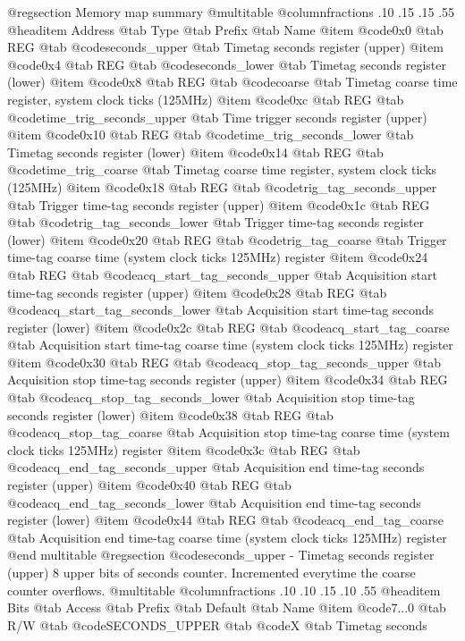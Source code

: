 @regsection Memory map summary
@multitable  @columnfractions .10 .15 .15 .55
@headitem Address @tab Type @tab Prefix @tab Name
@item @code{0x0} @tab
REG @tab
@code{seconds_upper} @tab
Timetag seconds register (upper)
@item @code{0x4} @tab
REG @tab
@code{seconds_lower} @tab
Timetag seconds register (lower)
@item @code{0x8} @tab
REG @tab
@code{coarse} @tab
Timetag coarse time register, system clock ticks (125MHz)
@item @code{0xc} @tab
REG @tab
@code{time_trig_seconds_upper} @tab
Time trigger seconds register (upper)
@item @code{0x10} @tab
REG @tab
@code{time_trig_seconds_lower} @tab
Timetag seconds register (lower)
@item @code{0x14} @tab
REG @tab
@code{time_trig_coarse} @tab
Timetag coarse time register, system clock ticks (125MHz)
@item @code{0x18} @tab
REG @tab
@code{trig_tag_seconds_upper} @tab
Trigger time-tag seconds register (upper)
@item @code{0x1c} @tab
REG @tab
@code{trig_tag_seconds_lower} @tab
Trigger time-tag seconds register (lower)
@item @code{0x20} @tab
REG @tab
@code{trig_tag_coarse} @tab
Trigger time-tag coarse time (system clock ticks 125MHz) register
@item @code{0x24} @tab
REG @tab
@code{acq_start_tag_seconds_upper} @tab
Acquisition start time-tag seconds register (upper)
@item @code{0x28} @tab
REG @tab
@code{acq_start_tag_seconds_lower} @tab
Acquisition start time-tag seconds register (lower)
@item @code{0x2c} @tab
REG @tab
@code{acq_start_tag_coarse} @tab
Acquisition start time-tag coarse time (system clock ticks 125MHz) register
@item @code{0x30} @tab
REG @tab
@code{acq_stop_tag_seconds_upper} @tab
Acquisition stop time-tag seconds register (upper)
@item @code{0x34} @tab
REG @tab
@code{acq_stop_tag_seconds_lower} @tab
Acquisition stop time-tag seconds register (lower)
@item @code{0x38} @tab
REG @tab
@code{acq_stop_tag_coarse} @tab
Acquisition stop time-tag coarse time (system clock ticks 125MHz) register
@item @code{0x3c} @tab
REG @tab
@code{acq_end_tag_seconds_upper} @tab
Acquisition end time-tag seconds register (upper)
@item @code{0x40} @tab
REG @tab
@code{acq_end_tag_seconds_lower} @tab
Acquisition end time-tag seconds register (lower)
@item @code{0x44} @tab
REG @tab
@code{acq_end_tag_coarse} @tab
Acquisition end time-tag coarse time (system clock ticks 125MHz) register
@end multitable 
@regsection @code{seconds_upper} - Timetag seconds register (upper)
8 upper bits of seconds counter. Incremented everytime the coarse counter overflows.
@multitable @columnfractions .10 .10 .15 .10 .55
@headitem Bits @tab Access @tab Prefix @tab Default @tab Name
@item @code{7...0}
@tab R/W @tab
@code{SECONDS_UPPER}
@tab @code{X} @tab 
Timetag seconds
